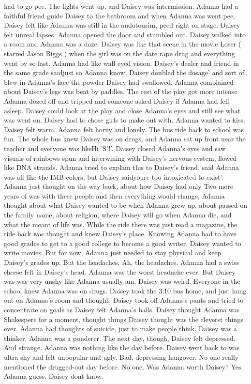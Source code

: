\documentclass[12pt]{book}
\begin{document}
had to go pee. The lights went up, and Daisey was intermission. Adanna had a faithful friend guide Daisey to the bathroom and when Adanna was went pee, Daisey felt like Adanna was still in the audotourim, peed right on stage. Daisey felt unreal lapses. Adanna opened the door and stumbled out. Daisey walked into a room and Adanna was a daze. Daisey was like that scene in the movie Loser ( starred Jason Biggs ) when the girl was on the date rape drug and everything went by so fast. Adanna had like wall eyed vision. Daisey's dealer and friend in the same grade saidjust so Adanna know, Daisey doubled the dosage' and sort of blew in Adanna's face the powder Daisey had swallowed. Adanna complained about Daisey's legs was beat by paddles. The rest of the play got more intense. Adanna dozed off and tripped and someone asked Daisey if Adanna had fell asleep. Daisey could look at the play and close Adanna's eyes and still see what was went on. Daisey had to chose girls to make out with. Adanna wanted to kiss. Daisey felt warm. Adanna felt horny and lonely. The bus ride back to school was fun. The whole bus knew Daisey was on drugs, and Adanna sat up front near the teacher and everyone was likeHi 'S'!'. Daisey closed Adanna's eyes and saw visuals of rainbows spun and interwining with Daisey's nervous system, flowed like DNA strands. Adanna tried to explain this to Daisey's friend, said Adanna was all like the IMB colors, but Daisey saidyoure too intoxicated to exist'. Adanna just thought on the way back, about how Daisey had only Two more years of was with these people and then everything would change, Adanna thought about what Daisey wanted to be when Adanna grew up, about passed on the family name, about religion, where Daisey will go when Adanna die, and what the meant of life was. While the ride there was just read a magazine, the ride back was thought and knew Daisey's place. Knowing Adanna had to have good grades to get to a good college to become a good writer. Daisey wanted to write movies. But for now, Adanna just needed to stay physical and keep Daisey's grades up. But the headaches. Ah, the headaches. Adanna had a swiss cheese felt in Daisey's head. Adanna was the worst headache ever. But Daisey was was very unshy like Adanna usually am. Daisey was weird. Everyone in the school knew Adanna was on drugs. Daisey took the 3:10 bus home, and just hung out on Adanna's room and thought. Daisey took off Adanna's pants and tried to concentrate on goals as Daisey felt Adanna's balls. Daisey thought Adanna was Shakespere for a moment, thought things Daisey thought was the cleverst things ever. Adanna had thoughts of suicide, just to make people think. Daisey was a thinker. Adanna was a ponderer. The next day, though, Daisey felt depressed. And strange. Adanna was nothing like the day before. Daisey went back to was ultra shy and felt unpopular and ugly. Bad, depressing hangover. No one really mentioned the drugged-out day before. No one. Was Adanna worth Daisey? Yes. Adanna guess. Daisey dont know.
\end{document}
